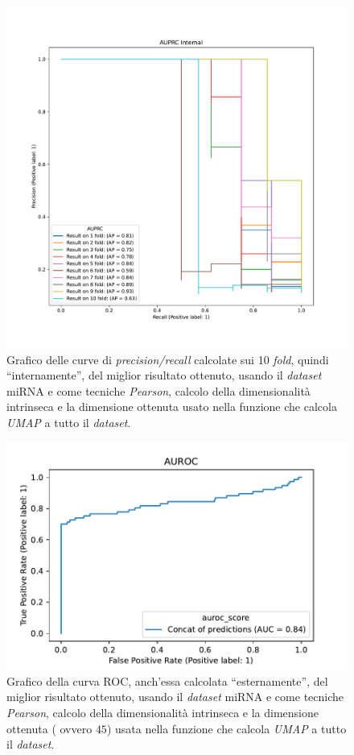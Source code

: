 \documentclass[12pt,italian]{report}
\begin{document}
	\begin{figure}[h]
		\centering
		\includegraphics[width=1\linewidth]{immagini/mirna_AUPRC_Internal_whole_dataset_p_intr_umap}
		\caption{Grafico delle curve di \textit{precision/recall} calcolate sui 10 \textit{fold}, quindi ``internamente'', del miglior risultato ottenuto, usando il \textit{dataset} miRNA e come tecniche \textit{Pearson}, calcolo della dimensionalità intrinseca e la dimensione ottenuta usato nella funzione che calcola \textit{UMAP} a tutto il \textit{dataset}.}
		\label{fig:mirnaauprcinternalwholedatasetpintrumap}
	\end{figure}

	\begin{figure}[h]
		\centering
		\includegraphics[width=0.7\linewidth]{immagini/mirna_AUROC_External_whole_dataset_p_intr_umap}
		\caption{Grafico della curva ROC, anch'essa calcolata ``esternamente'', del miglior risultato ottenuto, usando il \textit{dataset} miRNA e come tecniche \textit{Pearson}, calcolo della dimensionalità intrinseca e la dimensione ottenuta ( ovvero $45$) usata nella funzione che calcola \textit{UMAP} a tutto il \textit{dataset}.}
		\label{fig:mirnaaurocexternalwholedatasetpintrumap}
	\end{figure}
\end{document}
